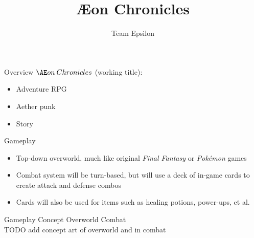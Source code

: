 \documentclass{teamepsilon}
\title{{\AE}on Chronicles}
\author{Team Epsilon}
\institute{Colorado School of Mines}
\begin{document}
\begin{frame}{Overview}
    $\AE on\:Chronicles$ (working title):
    \begin{itemize}
        \item Adventure RPG
        \item Aether punk
        \item Story
    \end{itemize}
\end{frame}

\begin{frame}{Gameplay}
    \begin{itemize}
        \item Top-down overworld, much like original \textit{Final Fantasy}
            or \textit{Pok\'emon} games
        \item Combat system will be turn-based, but will use a deck of in-game
            cards to create attack and defense combos
        \item Cards will also be used for items such as healing potions,
            power-ups, et al.
    \end{itemize}
\end{frame}

\begin{frame}{Gameplay Concept}
    Overworld \hfill Combat \\
    TODO add concept art of overworld and in combat
\end{frame}
\end{document}
